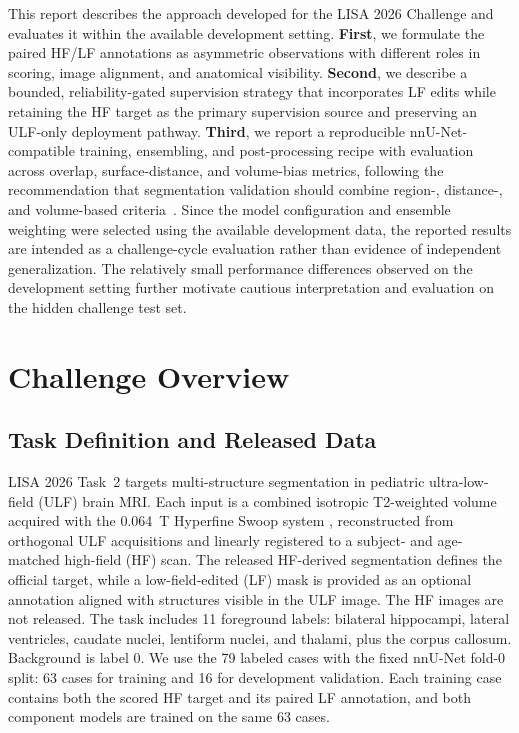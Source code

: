 \documentclass[runningheads]{llncs}
\begin{document}
This report describes the approach developed for the LISA 2026 Challenge and evaluates it within the available development setting. \textbf{First}, we formulate the paired HF/LF annotations as asymmetric observations with different roles in scoring, image alignment, and anatomical visibility. \textbf{Second}, we describe a bounded, reliability-gated supervision strategy that incorporates LF edits while retaining the HF target as the primary supervision source and preserving an ULF-only deployment pathway. \textbf{Third}, we report a reproducible nnU-Net-compatible training, ensembling, and post-processing recipe with evaluation across overlap, surface-distance, and volume-bias metrics, following the recommendation that segmentation validation should combine region-, distance-, and volume-based criteria~\cite{taha2015metrics}. Since the model configuration and ensemble weighting were selected using the available development data, the reported results are intended as a challenge-cycle evaluation rather than evidence of independent generalization. The relatively small performance differences observed on the development setting further motivate cautious interpretation and evaluation on the hidden challenge test set.




\section{Challenge Overview}

\subsection{Task Definition and Released Data}

LISA 2026 Task~2 targets multi-structure segmentation in pediatric ultra-low-field (ULF) brain MRI. Each input is a combined isotropic T2-weighted volume acquired with the 0.064~T Hyperfine Swoop system \cite{lisa2026challenge}, reconstructed from orthogonal ULF acquisitions and linearly registered to a subject- and age-matched high-field (HF) scan. The released HF-derived segmentation defines the official target, while a low-field-edited (LF) mask is provided as an optional annotation aligned with structures visible in the ULF image. The HF images are not released. The task includes 11 foreground labels: bilateral hippocampi, lateral ventricles, caudate nuclei, lentiform nuclei, and thalami, plus the corpus callosum. Background is label 0. We use the 79 labeled cases with the fixed nnU-Net fold-0 split: 63 cases for training and 16 for development validation. Each training case contains both the scored HF target and its paired LF annotation, and both component models are trained on the same 63 cases.
\end{document}
